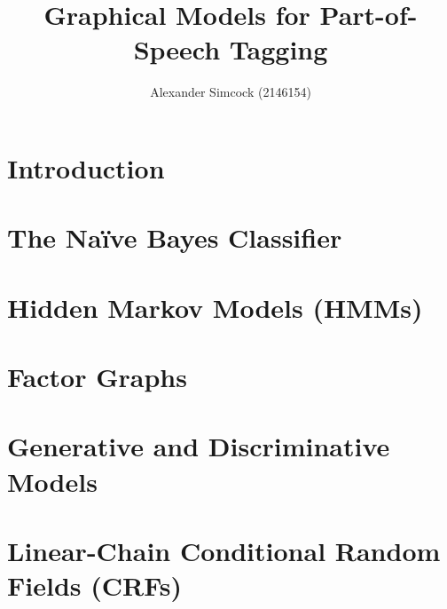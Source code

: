 \documentclass[12pt]{article}
\title{Graphical Models for Part-of-Speech Tagging} %
\author{Alexander Simcock (2146154)}
\date{}
\begin{document}





\maketitle

\section{Introduction}


\section{The Na{\"i}ve Bayes Classifier}


\section{Hidden Markov Models (HMMs)}


\section{Factor Graphs}


\section{Generative and Discriminative Models}


\section{Linear-Chain Conditional Random Fields (CRFs)}


\printbibliography
\end{document}
